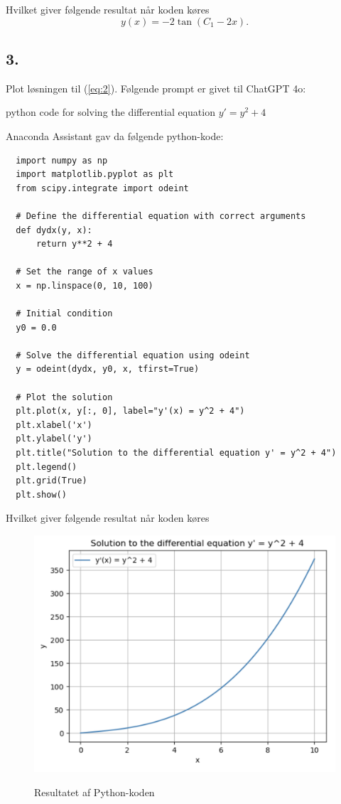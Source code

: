 \documentclass[12pt]{article}
\theoremstyle{definition}
\begin{document}
Hvilket giver følgende resultat når koden køres
\[ 
  y(x) = -2 \tan(C_1 - 2x)
.\]



\subsection*{3.}
Plot løsningen til (\ref{eq:2}).
\bigbreak
Følgende prompt er givet til ChatGPT 4o: 

\begin{blueline}
  python code for solving the differential equation $y' = y^2 + 4$ 
\end{blueline}

Anaconda Assistant gav da følgende python-kode:
\begin{verbatim}
  import numpy as np
  import matplotlib.pyplot as plt
  from scipy.integrate import odeint

  # Define the differential equation with correct arguments
  def dydx(y, x):
      return y**2 + 4

  # Set the range of x values
  x = np.linspace(0, 10, 100)

  # Initial condition
  y0 = 0.0

  # Solve the differential equation using odeint
  y = odeint(dydx, y0, x, tfirst=True)

  # Plot the solution
  plt.plot(x, y[:, 0], label="y'(x) = y^2 + 4")
  plt.xlabel('x')
  plt.ylabel('y')
  plt.title("Solution to the differential equation y' = y^2 + 4")
  plt.legend()
  plt.grid(True)
  plt.show()
\end{verbatim}

Hvilket giver følgende resultat når koden køres

\begin{figure} [ht]
  \centering
  \caption{Resultatet af Python-koden}
  \includegraphics[width=0.8\linewidth]{../figures/TO_11_1.png}
  \label{fig:TO_11_1}
\end{figure}
\end{document}
